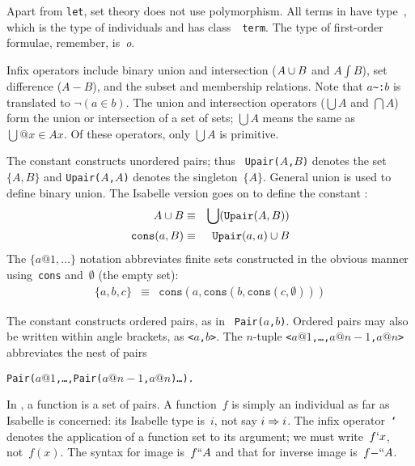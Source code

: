 Apart from \texttt{let}, set theory does not use polymorphism.  All terms in
{\ZF} have type~, which is the type of individuals and has class~{\tt
  term}.  The type of first-order formulae, remember, is~\textit{o}.

Infix operators include binary union and intersection ($A\cup B$ and
$A\int B$), set difference ($A-B$), and the subset and membership
relations.  Note that $a$\verb|~:|$b$ is translated to $\neg(a\in b)$.  The
union and intersection operators ($\bigcup A$ and $\bigcap A$) form the
union or intersection of a set of sets; $\bigcup A$ means the same as
$\bigcup@{x\in A}x$.  Of these operators, only $\bigcup A$ is primitive.

The constant  constructs unordered pairs; thus {\tt
  Upair($A$,$B$)} denotes the set~$\{A,B\}$ and \texttt{Upair($A$,$A$)}
denotes the singleton~$\{A\}$.  General union is used to define binary
union.  The Isabelle version goes on to define the constant
:
\begin{eqnarray*}
   A\cup B              & \equiv &       \bigcup(\texttt{Upair}(A,B)) \\
   \texttt{cons}(a,B)      & \equiv &        \texttt{Upair}(a,a) \cup B
\end{eqnarray*}
The $\{a@1, \ldots\}$ notation abbreviates finite sets constructed in the
obvious manner using~\texttt{cons} and~$\emptyset$ (the empty set):
\begin{eqnarray*}
 \{a,b,c\} & \equiv & \texttt{cons}(a,\texttt{cons}(b,\texttt{cons}(c,\emptyset)))
\end{eqnarray*}

The constant  constructs ordered pairs, as in {\tt
Pair($a$,$b$)}.  Ordered pairs may also be written within angle brackets,
as {\tt<$a$,$b$>}.  The $n$-tuple {\tt<$a@1$,\ldots,$a@{n-1}$,$a@n$>}
abbreviates the nest of pairs\par\nobreak
\centerline{\texttt{Pair($a@1$,\ldots,Pair($a@{n-1}$,$a@n$)\ldots).}}

In {\ZF}, a function is a set of pairs.  A {\ZF} function~$f$ is simply an
individual as far as Isabelle is concerned: its Isabelle type is~$i$, not
say $i\Rightarrow i$.  The infix operator~{\tt`} denotes the application of a
function set to its argument; we must write~$f{\tt`}x$, not~$f(x)$.  The
syntax for image is~$f{\tt``}A$ and that for inverse image is~$f{\tt-``}A$.


